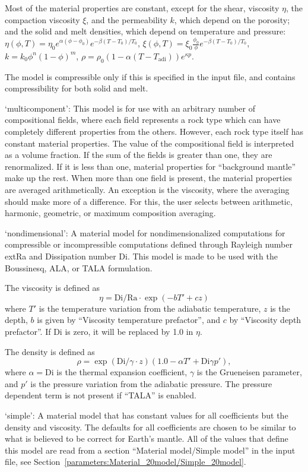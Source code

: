 \begin{itemize}
Most of the material properties are constant, except for the shear, viscosity $\eta$, the compaction viscosity $\xi$, and the permeability $k$, which depend on the porosity; and the solid and melt densities, which depend on temperature and pressure:
 $\eta(\phi,T) = \eta_0 e^{\alpha(\phi-\phi_0)} e^{-\beta(T-T_0)/T_0}$, $\xi(\phi,T) = \xi_0 \frac{\phi_0}{\phi} e^{-\beta(T-T_0)/T_0}$, $k=k_0 \phi^n (1-\phi)^m$, $\rho=\rho_0 (1 - \alpha (T - T_\text{adi})) e^{\kappa p}$.

The model is compressible only if this is specified in the input file, and contains compressibility for both solid and melt.

`multicomponent': This model is for use with an arbitrary number of compositional fields, where each field represents a rock type which can have completely different properties from the others. However, each rock type itself has constant material properties.  The value of the  compositional field is interpreted as a volume fraction. If the sum of the fields is greater than one, they are renormalized.  If it is less than one, material properties  for ``background mantle'' make up the rest. When more than one field is present, the material properties are averaged arithmetically.  An exception is the viscosity, where the averaging should make more of a difference.  For this, the user selects between arithmetic, harmonic, geometric, or maximum composition averaging.

`nondimensional': A material model for nondimensionalized computations for compressible or incompressible computations defined through Rayleigh number 	ext{Ra} and Dissipation number Di. This model is made to be used with the Boussinesq, ALA, or TALA formulation.

The viscosity is defined as \[\eta = \text{Di} / \text{Ra} \cdot \exp(-b T' + c z)\] where $T'$ is the temperature variation from the adiabatic temperature, $z$ is the depth, $b$ is given by ``Viscosity temperature prefactor'', and $c$ by ``Viscosity depth prefactor''. If $\text{Di}$ is zero, it will be replaced by 1.0 in $\eta$.

The density is defined as \[\rho = \exp(\text{Di}/\gamma \cdot z)  (1.0 - \alpha T' + \text{Di} \gamma p'),\] where $\alpha=\text{Di}$ is the thermal expansion coefficient, $\gamma$ is the Grueneisen parameter, and $p'$ is the pressure variation from the adiabatic pressure. The pressure dependent term is not present if ``TALA'' is enabled.

`simple': A material model that has constant values for all coefficients but the density and viscosity. The defaults for all coefficients are chosen to be similar to what is believed to be correct for Earth's mantle. All of the values that define this model are read from a section ``Material model/Simple model'' in the input file, see Section~\ref{parameters:Material_20model/Simple_20model}.


\end{itemize}
